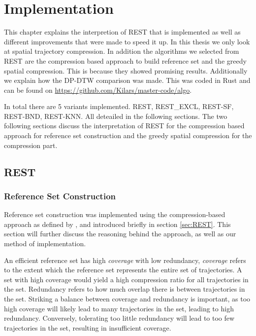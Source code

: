 \chapter{Implementation}
\label{chap:impl}
This chapter explains the interpretion of REST that is implemented as well as different improvements that were made to speed it up. In this thesis we only look at spatial trajectory compression. In addition the algorithms we selected from REST are the compression based approach to build reference set and the greedy spatial compression. This is because they showed promising results. Additionally we explain how the DP-DTW comparison was made. This was coded in Rust and can be found on \href{https://github.com/Kilars/master-code/algo}{https://github.com/Kilars/master-code/algo}.

In total there are 5 variants implemented. REST, REST\_EXCL, REST-SF, REST-BND, REST-KNN. All deteailed in the following sections. The two following sections discuss the interpretation of REST for the compression based approach for reference set construction and the greedy spatial compression for the compression part.
\section{REST}
\subsection{Reference Set Construction}
Reference set construction was implemented using the compression-based approach as defined by \textcite{zhao2018rest}, and introduced briefly in section \ref*{sec:REST}. This section will further discuss the reasoning behind the approach, as well as our method of implementation.

An efficient reference set has high \textit{coverage} with low redundancy, \textit{coverage} refers to the extent which the reference set represents the entire set of trajectories. A set with high coverage would yield a high compression ratio for all trajectories in the set. Redundancy refers to how much overlap there is between trajectories in the set. Striking a balance between coverage and redundancy is important, as too high coverage will likely lead to many trajectories in the set, leading to high redundancy. Conversely, tolerating too little redundancy will lead to too few trajectories in the set, resulting in insufficient coverage.

